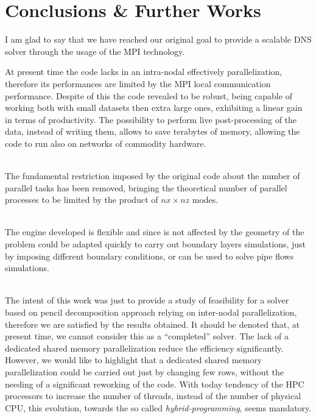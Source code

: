 \chapter{Conclusions \& Further Works}

I am glad to say that we have reached our original goal to provide a scalable DNS solver through the usage of the MPI technology. \par
At present time the code lacks in an intra-nodal effectively parallelization, therefore its performances are limited by the MPI local communication performance. Despite of this the code revealed to be robust, being capable of working both with small datasets then extra large ones, exhibiting a linear gain in terms of productivity.
The possibility to perform live post-processing of the data, instead of writing them, allows to save terabytes of memory, allowing the code to run also on networks of commodity hardware. \\~\par
The fundamental restriction imposed by the original code about the number of parallel tasks has been removed, bringing the theoretical number of parallel processes to be limited by the product of $nx \times nz$ modes. \\~\par
The engine developed is flexible and since is not affected by the geometry of the problem could be adapted quickly to carry out boundary layers simulations, just by imposing different boundary conditions, or can be used to solve pipe flows simulations.\\~\par

The intent of this work was just to provide a study of feasibility for a solver based on pencil decomposition approach relying on inter-nodal parallelization, therefore we are satisfied by the results obtained. It should be denoted that, at present time, we cannot consider this as a ``completed'' solver. The lack of a dedicated shared memory parallelization reduce the efficiency significantly. However, we would like to highlight that a dedicated shared memory parallelization could be carried out just by changing few rows, without the needing of a significant reworking of the code.
With today tendency of the HPC processors to increase the number of threads, instead of the number of physical CPU, this evolution, towards the so called \emph{hybrid-programming}, seems mandatory.
